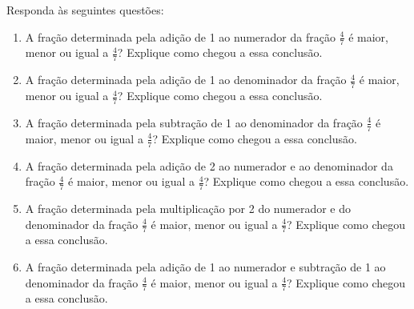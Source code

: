 \begin{atividade}{}\label{chap4-ativ15}

Responda às seguintes questões:

\begin{enumerate}  %
  \item     A fração determinada pela adição de 1 ao numerador da fração     $\frac{4}{7}$ é maior, menor ou igual a     $\frac{4}{7}$? Explique como chegou a essa conclusão.
  \item     A fração determinada pela adição de 1 ao denominador da fração     $\frac{4}{7}$ é mai\-or, menor ou igual a     $\frac{4}{7}$? Explique como chegou a essa conclusão.
  \item     A fração determinada pela subtração de 1 ao denominador da fração     $\frac{4}{7}$ é maior, menor ou igual a     $\frac{4}{7}$? Explique como chegou a essa conclusão.
  \item     A fração determinada pela adição de 2 ao numerador e ao denominador da fração     $\frac{4}{7}$ é maior, menor ou igual a     $\frac{4}{7}$? Explique como chegou a essa conclusão.
  \item     A fração determinada pela multiplicação por 2 do numerador e do denominador da fração     $\frac{4}{7}$ é maior, menor ou igual a     $\frac{4}{7}$? Explique como chegou a essa conclusão.
  \item     A fração determinada pela adição de 1 ao numerador e subtração de 1 ao denominador da fração     $\frac{4}{7}$ é maior, menor ou igual a     $\frac{4}{7}$? Explique como chegou a essa conclusão.
\end{enumerate} %

\end{atividade}

